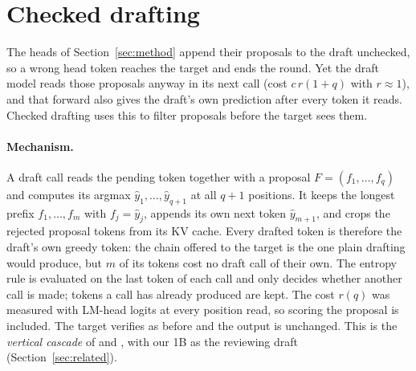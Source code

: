 \section{Checked drafting}
\label{sec:checked}

The heads of Section~\ref{sec:method} append their proposals to the draft unchecked, so a wrong head
token reaches the target and ends the round. Yet the draft model reads those proposals anyway in its
next call (cost $c\,r(1+q)$ with $r\approx1$), and that forward also gives the draft's own prediction
after every token it reads. Checked drafting uses this to filter proposals before the target sees them.

\paragraph{Mechanism.} A draft call reads the pending token together with a proposal
$F=(f_1,\dots,f_q)$ and computes its argmax $\hat y_1,\dots,\hat y_{q+1}$ at all $q+1$ positions. It keeps
the longest prefix $f_1,\dots,f_m$ with $f_j=\hat y_j$, appends its own next token $\hat y_{m+1}$, and
crops the rejected proposal tokens from its KV cache. Every drafted token is therefore the draft's own
greedy token: the chain offered to the target is the one plain drafting would produce, but $m$ of its
tokens cost no draft call of their own. The entropy rule is evaluated on the last token of each call and
only decides whether another call is made; tokens a call has already produced are kept. The cost
$r(q)$ was measured with LM-head logits at every position read, so scoring the proposal is included.
The target verifies as before and the output is unchanged. This is the \emph{vertical cascade} of
\citet{chen2024cascade} and \citet{spector2023staged}, with our 1B as the reviewing draft
(Section~\ref{sec:related}).

